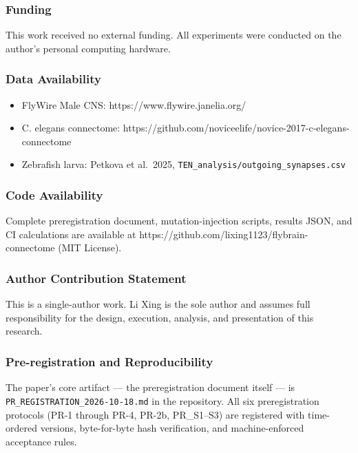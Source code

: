 \documentclass[
]{article}
\providecommand{\tightlist}{%
  \setlength{\itemsep}{0pt}\setlength{\parskip}{0pt}}
\begin{document}
\subsubsection{Funding}\label{funding}

This work received no external funding. All experiments were conducted
on the author's personal computing hardware.

\subsubsection{Data Availability}\label{data-availability}

\begin{itemize}
\tightlist
\item
  FlyWire Male CNS: https://www.flywire.janelia.org/
\item
  C. elegans connectome:
  https://github.com/noviceelife/novice-2017-c-elegans-connectome
\item
  Zebrafish larva: Petkova et al.~2025,
  \texttt{TEN\_analysis/outgoing\_synapses.csv}
\end{itemize}

\subsubsection{Code Availability}\label{code-availability}

Complete preregistration document, mutation-injection scripts, results
JSON, and CI calculations are available at
https://github.com/lixing1123/flybrain-connectome (MIT License).

\subsubsection{Author Contribution
Statement}\label{author-contribution-statement}

This is a single-author work. Li Xing is the sole author and assumes
full responsibility for the design, execution, analysis, and
presentation of this research.

\subsubsection{Pre-registration and
Reproducibility}\label{pre-registration-and-reproducibility}

The paper's core artifact --- the preregistration document itself --- is
\texttt{PR\_REGISTRATION\_2026-10-18.md} in the repository. All six
preregistration protocols (PR-1 through PR-4, PR-2b, PR\_S1--S3) are
registered with time-ordered versions, byte-for-byte hash verification,
and machine-enforced acceptance rules.
\end{document}
